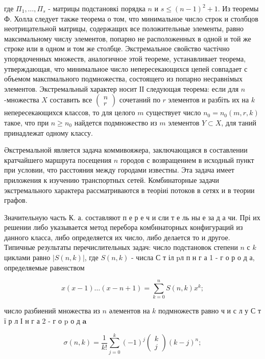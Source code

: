 \documentclass[10pt]{article}
\begin{document}
где $\Pi_{1}, \ldots, \Pi_{s}$ - матрицы подстановкі порядка $n$ и $s \leqslant(n-1)^{2}+1$. Из теоремы Ф. Холла следует также теорема о том, что минимальное число строк и столбцов неотрицательной матрицы, содержащих все положительные элементы, равно максимальному числу элементов, попарно не расположенных в одной и той же строке или в одном и том же столбце. Экстремальное свойство частічно упорядоченных множеств, аналогичное этой теореме, устанавливает теорема, утверждающая, что минимальное число непересекающихся цепей совпадает с объемом макспмального подмножества, состоящего из попарно несравнімых элементов. Экстремальный характер носит ІІ следующая теорема: если для $n$-множества $X$ составить все $\left(\begin{array}{l}n \\ r\end{array}\right)$ сочетаний по $r$ элементов и разбіть их на $k$ непересекающихся классов, то для целого $m$ существует число $n_{0}=n_{0}(m, r, k)$ такое, что при $n \geqslant n_{0}$ найдется подмножество из $m$ элементов $Y \subset X$, для таний принадлежат одному классу.



Әкстремальной является задача коммивояжера, заключающаяся в составлении кратчайшего маршрута посещения $n$ городов с возвращением в исходный пункт при условии, что расстояния между городами известны. Эта задача имеет приложения к изучению транспортных сетей. Комбинаторные задачи экстремального характера рассматриваются в теоріиі потоков в сетях и в теории графов.



Значительную часть К. а. составляют п е р е ч и сли т е ль ны е за д а чи. Прі их решении либо указывается метод перебора комбннаторных конфигураций из данного класса, либо определяется их число, либо делается то и другое. Типичные результаты перечислительных задач: число подстановок степени $n$ с $k$ циклами равно $|S(n, k)|$, где $S(n, k)$ - числа С т іл pл п н г а 1 - г о р о д а, определяемые равенством



\[

x(x-1) \ldots(x-n+1)=\sum_{k=0}^{n} S(n, k) x^{k} ;

\]



число разбиений множества из $n$ әлементов на $k$ подмножеств равно ч и с л у С т ї р л І н г а 2 - г о p $о$ д $\mathbf{a}$



\[

\sigma(n, k)=\frac{1}{k !} \sum_{j=0}^{k}(-1)^{j}\left(\begin{array}{l}

k \\

j

\end{array}\right)(k-j)^{n} ;

\]
\end{document}
